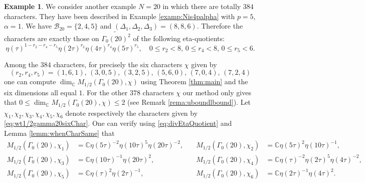 \documentclass[12pt]{amsart}
\numberwithin{equation}{section}
\theoremstyle{plain}
\theoremstyle{definition}
\newtheorem{examp}[thm]{Example}
\theoremstyle{remark}
\newcommand\numC{\mathbb{C}}
\newcommand\Dcover[2]{\widetilde{#1^{#2}}}
\begin{document}
\begin{examp}
We consider another example $N=20$ in which there are totally $384$ characters. They have been described in Example \ref{examp:Nis4palpha} with $p=5$, $\alpha=1$. We have $\mathscr{B}_{20}=\{2,4,5\}$ and $(\Delta_1,\Delta_2,\Delta_3)=(8,8,6)$. Therefore the characters are exactly those on $\Dcover{\Gamma_0(20)}{2}$ of the following eta-quotients:
\begin{equation*}
\eta(\tau)^{1-r_2-r_4-r_5}\eta(2\tau)^{r_2}\eta(4\tau)^{r_4}\eta(5\tau)^{r_5},\quad 0\leq r_2<8,\,0\leq r_4<8,\,0\leq r_5<6.
\end{equation*}
\end{examp}
Among the $384$ characters, for precisely the six characters $\chi$ given by
\begin{equation}
\label{eq:wt1/2gamma20sixChar}
(r_2,r_4,r_5)=(1,6,1),\,(3,0,5),\,(3,2,5),\,(5,6,0),\,(7,0,4),\,(7,2,4)
\end{equation}
one can compute $\dim_\numC M_{1/2}(\Gamma_0(20),\chi)$ using Theorem \ref{thm:main} and the six dimensions all equal $1$. For the other $378$ characters $\chi$ our method only gives that $0\leq\dim_\numC M_{1/2}(\Gamma_0(20),\chi)\leq2$ (see Remark \ref{rema:uboundlbound}). Let $\chi_1,\chi_2,\chi_3,\chi_4,\chi_5,\chi_6$ denote respectively the characters given by \eqref{eq:wt1/2gamma20sixChar}. One can verify using \eqref{eq:divEtaQuotient} and Lemma \ref{lemm:whenCharSame} that
\begin{align*}
M_{1/2}(\Gamma_0(20),\chi_1)&=\numC\eta(5\tau)^{-2}\eta(10\tau)^5\eta(20\tau)^{-2},\quad &M_{1/2}(\Gamma_0(20),\chi_2)&=\numC\eta(5\tau)^{2}\eta(10\tau)^{-1},\\
M_{1/2}(\Gamma_0(20),\chi_3)&=\numC\eta(10\tau)^{-1}\eta(20\tau)^2,\quad &M_{1/2}(\Gamma_0(20),\chi_4)&=\numC\eta(\tau)^{-2}\eta(2\tau)^5\eta(4\tau)^{-2},\\
M_{1/2}(\Gamma_0(20),\chi_5)&=\numC\eta(\tau)^{2}\eta(2\tau)^{-1},\quad &M_{1/2}(\Gamma_0(20),\chi_6)&=\numC\eta(2\tau)^{-1}\eta(4\tau)^{2}.
\end{align*}
\end{document}
